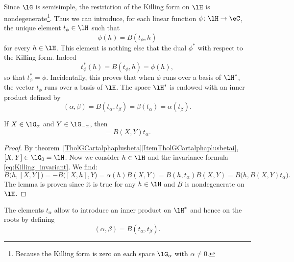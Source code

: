 Since \( \lG\) is semisimple, the restriction of the Killing form on \( \lH\) is nondegenerate\footnote{Because the Killing form is zero on each space \( \lG_{\alpha}\) with \( \alpha\neq 0\).}. Thus we can introduce, for each linear function $\phi\colon \lH\to \eC$, the unique element $t_{\phi}\in\lH$ such that
\begin{equation}
	\phi(h)=B(t_{\phi},h)
\end{equation}
for every $h\in\lH$.  This element is nothing else that the dual \( \phi^*\) with respect to the Killing form. Indeed
\begin{equation}
	t_{\phi}^*(h)=B(t_{\phi},h)=\phi(h),
\end{equation}
so that \( t_{\phi}^*=\phi\). Incidentally, this proves that when \( \phi\) runs over a basis of \( \lH^*\), the vector \( t_{\phi}\) runs over a basis of \( \lH\). The space $\lH^*$ is endowed with an inner product defined by
\begin{equation}        \label{EqDefInnprHestrar}
	(\alpha,\beta) = B(t_{\alpha},t_{\beta})=\beta(t_{\alpha})=\alpha(t_{\beta}).
\end{equation}

\begin{lemma}       \label{LemXYBXYtalpha}\label{Propoxalphaymoinaalpha}
	If \( X\in\lG_{\alpha}\) and \( Y\in\lG_{-\alpha}\), then
	\begin{equation}
		[X,Y]=B(X,Y)t_{\alpha}.
	\end{equation}
\end{lemma}

\begin{proof}
	By theorem~\ref{TholGCartalphaplusbeta}\ref{ItemTholGCartalphaplusbetai}, $[X,Y]\in\lG_0=\lH$. Now we consider $h\in\lH$ and the invariance formula \eqref{eq:Killing_invariant}. We find:
	\begin{equation}
		B\big( h,[X,Y] \big)=-B\big( [X,h],Y \big)=\alpha(h)B(X,Y)=B(h,t_{\alpha})B(X,Y)=B\big(h,B(X,Y)t_{\alpha}\big).
	\end{equation}
	The lemma is proven since it is true for any $h\in\lH$ and $B$ is nondegenerate on $\lH$.
\end{proof}

The elements \( t_{\alpha}\) allow to introduce an inner product on \( \lH^*\) and hence on the roots by defining
\begin{equation}
	(\alpha,\beta)=B(t_{\alpha},t_{\beta}).
\end{equation}

